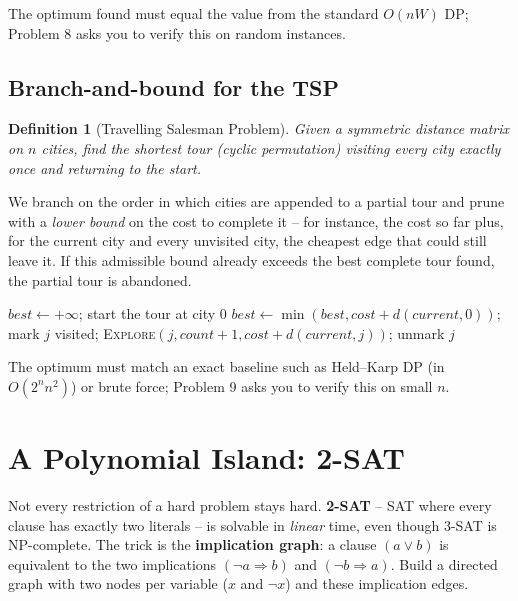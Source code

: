 \documentclass[11pt]{article}
\newtheorem{definition}[theorem]{Definition}
\begin{document}
The optimum found must equal the value from the standard $O(nW)$ DP; Problem 8
asks you to verify this on random instances.

\subsection{Branch-and-bound for the TSP}

\begin{definition}[Travelling Salesman Problem]
Given a symmetric distance matrix on $n$ cities, find the shortest tour (cyclic
permutation) visiting every city exactly once and returning to the start.
\end{definition}

We branch on the order in which cities are appended to a partial tour and prune
with a \emph{lower bound} on the cost to complete it -- for instance, the cost
so far plus, for the current city and every unvisited city, the cheapest edge
that could still leave it. If this admissible bound already exceeds the best
complete tour found, the partial tour is abandoned.

\begin{algorithm}[h]
\caption{Branch-and-Bound TSP}
\begin{algorithmic}[1]
\State $best \gets +\infty$; start the tour at city $0$
     \Return \EndIf
     \State $best \gets \min(best, cost + d(current, 0))$; \Return \EndIf
     \Return {} \EndIf
        \State mark $j$ visited; \textsc{Explore}$(j, count+1, cost + d(current, j))$; unmark $j$
    \EndFor
\EndFunction
\end{algorithmic}
\end{algorithm}

The optimum must match an exact baseline such as Held--Karp DP (in
$O(2^n n^2)$) or brute force; Problem 9 asks you to verify this on small $n$.

\section{A Polynomial Island: 2-SAT}

Not every restriction of a hard problem stays hard. \textbf{2-SAT} -- SAT where
every clause has exactly two literals -- is solvable in \emph{linear} time,
even though $3$-SAT is NP-complete. The trick is the \textbf{implication
graph}: a clause $(a \lor b)$ is equivalent to the two implications
$(\lnot a \Rightarrow b)$ and $(\lnot b \Rightarrow a)$. Build a directed graph
with two nodes per variable ($x$ and $\lnot x$) and these implication edges.
\end{document}
